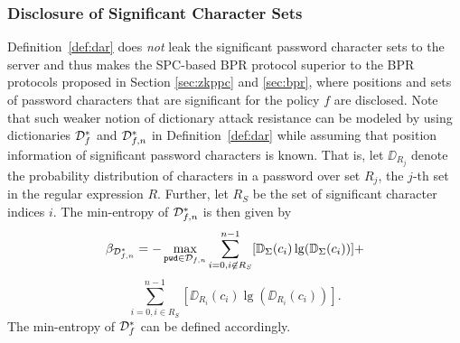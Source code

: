 
\subsubsection{Disclosure of Significant Character Sets} %
Definition~\ref{def:dar} does \emph{not} leak the significant password character sets to the server and thus makes the \ac{SPC}-based \ac{BPR} protocol superior to the \ac{BPR} protocols proposed in Section \ref{sec:zkppc} and \ref{sec:bpr}, where positions and sets of password characters that are significant for the policy $f$ are disclosed. Note that such weaker notion of dictionary attack resistance can be modeled by using dictionaries $\mathcal{D}_{f}^\ast$ and $\mathcal{D}_{f,n}^\ast$ in Definition~\ref{def:dar} while assuming that position information of significant password characters is known. 
That is,
let $\DD_{R_j}$ denote the probability distribution of characters in a password \pwd over set $R_j$, the $j$-th set in the regular expression $R$.
Further, let $R_S$ be the set of significant character indices $i$.
The min-entropy of $\mathcal{D}_{f,n}^\ast$ is then given by
\[\beta_{\mathcal{D}^\ast_{f,n}} = -\max_{\mathtt{pwd}\in \mathcal{D}_{f,n}} \sum_{i=0, i\not\in R_S}^{n-1} [\mathbb{D}_\Sigma(c_i)\lg(\mathbb{D}_\Sigma(c_i))] +\]
\[ \sum_{i=0, i\in R_S}^{n-1} [\DD_{R_i}(c_i)\lg(\DD_{R_i}(c_i))].\]
The min-entropy of $\mathcal{D}_{f}^\ast$ can be defined accordingly.

